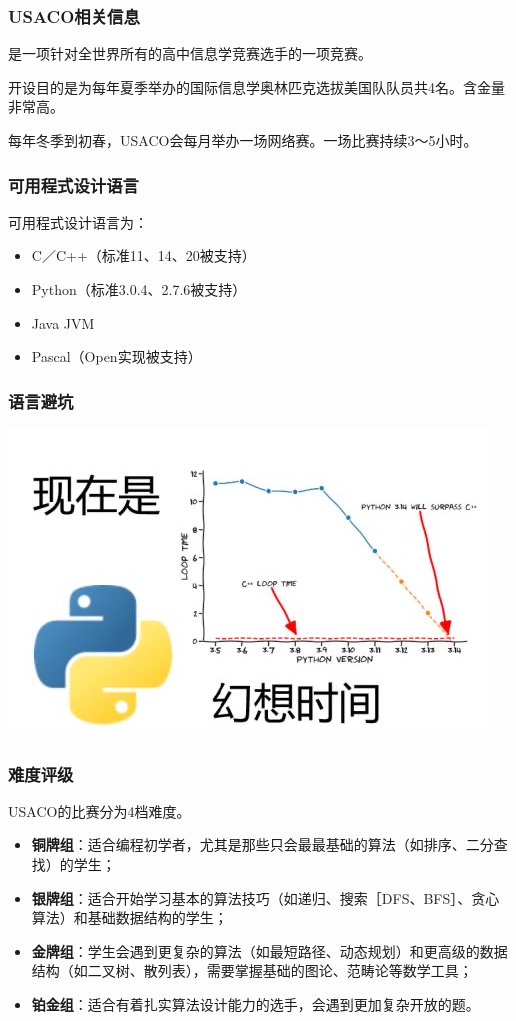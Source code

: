 \documentclass{beamer}
\begin{document}
\begin{frame}
  \frametitle{USACO相关信息}
  是一项针对全世界所有的高中信息学竞赛选手的一项竞赛。

  开设目的是为每年夏季举办的国际信息学奥林匹克选拔美国队队员共4名。含金量非常高。

  每年冬季到初春，USACO会每月举办一场网络赛。一场比赛持续3～5小时。
\end{frame}

\begin{frame}
  \frametitle{可用程式设计语言}
  可用程式设计语言为：
  \begin{itemize}
    \item C／C++（标准11、14、20被支持）
    \item Python（标准3.0.4、2.7.6被支持）
    \item Java JVM
    \item Pascal（Open实现被支持）
  \end{itemize}
\end{frame}

\begin{frame}
  \frametitle{语言避坑}
  \centering
  \includegraphics[width=.9\hsize]{pycpp}
\end{frame}

\begin{frame}
  \frametitle{难度评级}
  USACO的比赛分为4档难度。
  \begin{itemize}
    \item \textbf{铜牌组}：适合编程初学者，尤其是那些只会最最基础的算法（如排序、二分查找）的学生；
    \item \textbf{银牌组}：适合开始学习基本的算法技巧（如递归、搜索［DFS、BFS］、贪心算法）和基础数据结构的学生；
    \item \textbf{金牌组}：学生会遇到更复杂的算法（如最短路径、动态规划）和更高级的数据结构（如二叉树、散列表），需要掌握基础的图论、范畴论等数学工具；
    \item \textbf{铂金组}：适合有着扎实算法设计能力的选手，会遇到更加复杂开放的题。
  \end{itemize}
\end{frame}
\end{document}
